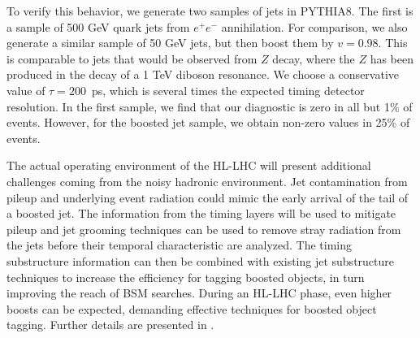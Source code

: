 To verify this behavior, we generate two samples of jets in PYTHIA8.
The first is a sample of 500 GeV quark jets from $e^+e^-$ annihilation.
For comparison, we also generate a similar sample of 50 GeV jets, but then boost them by $v=0.98$.
This is comparable to jets that would be observed from $Z$ decay, where the $Z$ has been produced in the decay of a 1 TeV diboson resonance.
We choose a conservative value of $\tau=200$~ps, which is several times the expected timing detector resolution.
In the first sample, we find that our diagnostic is zero in all but 1\% of events.
However, for the boosted jet sample, we obtain non-zero values in 25\% of events.

The actual operating environment of the HL-LHC will present additional challenges coming from the noisy hadronic environment.
Jet contamination from pileup and underlying event radiation could mimic the early arrival of the tail of a boosted jet.
The information from the timing layers will be used to mitigate pileup and jet grooming techniques can be used to remove stray radiation from the jets before their temporal characteristic are analyzed.
The timing substructure information can then be combined with existing jet substructure techniques to increase the efficiency for tagging boosted objects, in turn improving the reach of BSM searches.
During an HL-LHC phase, even higher boosts can be expected, demanding effective techniques for boosted object tagging.
Further details are presented in .
